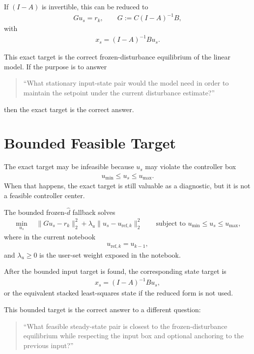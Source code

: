 \documentclass[11pt]{article}
\begin{document}
If $(I-A)$ is invertible, this can be reduced to
\begin{align}
G u_s = r_k,
\qquad
G := C(I-A)^{-1}B,
\end{align}
with
\begin{align}
x_s = (I-A)^{-1}Bu_s.
\end{align}

This exact target is the correct frozen-disturbance equilibrium of the linear model. If the purpose is to answer
\begin{quote}
``What stationary input-state pair would the model need in order to maintain the setpoint under the current disturbance estimate?''
\end{quote}
then the exact target is the correct answer.

\section{Bounded Feasible Target}

The exact target may be infeasible because $u_s$ may violate the controller box
\begin{align}
u_{\min} \le u_s \le u_{\max}.
\end{align}
When that happens, the exact target is still valuable as a diagnostic, but it is not a feasible controller center.

The bounded frozen-$\hat d$ fallback solves
\begin{align}
\min_{u_s}
\quad
\|Gu_s-r_k\|_2^2 + \lambda_u \|u_s-u_{\mathrm{ref},k}\|_2^2
\qquad
\text{subject to }
u_{\min} \le u_s \le u_{\max},
\end{align}
where in the current notebook
\begin{align}
u_{\mathrm{ref},k} = u_{k-1},
\end{align}
and $\lambda_u \ge 0$ is the user-set weight exposed in the notebook.

After the bounded input target is found, the corresponding state target is
\begin{align}
x_s = (I-A)^{-1}Bu_s,
\end{align}
or the equivalent stacked least-squares state if the reduced form is not used.

This bounded target is the correct answer to a different question:
\begin{quote}
``What feasible steady-state pair is closest to the frozen-disturbance equilibrium while respecting the input box and optional anchoring to the previous input?''
\end{quote}
\end{document}
